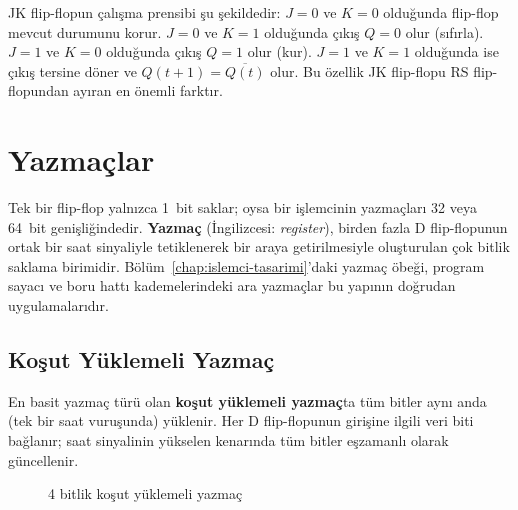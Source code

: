 JK flip-flopun çalışma prensibi şu şekildedir: $J = 0$ ve $K = 0$ olduğunda flip-flop mevcut durumunu korur. $J = 0$ ve $K = 1$ olduğunda çıkış $Q = 0$ olur (sıfırla). $J = 1$ ve $K = 0$ olduğunda çıkış $Q = 1$ olur (kur). $J = 1$ ve $K = 1$ olduğunda ise çıkış tersine döner ve $Q(t+1) = \overline{Q(t)}$ olur. Bu özellik JK flip-flopu RS flip-flopundan ayıran en önemli farktır.


\section{Yazmaçlar}
\label{sec:ekB-yazmaclar}

Tek bir flip-flop yalnızca 1~bit saklar; oysa bir işlemcinin yazmaçları 32 veya 64~bit genişliğindedir. \textbf{Yazmaç} (İngilizcesi: \textit{register}), birden fazla D flip-flopunun ortak bir saat sinyaliyle tetiklenerek bir araya getirilmesiyle oluşturulan çok bitlik saklama birimidir. Bölüm~\ref{chap:islemci-tasarimi}'daki yazmaç öbeği, program sayacı ve boru hattı kademelerindeki ara yazmaçlar bu yapının doğrudan uygulamalarıdır.

\subsection{Koşut Yüklemeli Yazmaç}

En basit yazmaç türü olan \textbf{koşut yüklemeli yazmaç}ta tüm bitler aynı anda (tek bir saat vuruşunda) yüklenir. Her D flip-flopunun girişine ilgili veri biti bağlanır; saat sinyalinin yükselen kenarında tüm bitler eşzamanlı olarak güncellenir.

\begin{figure}[H]
\centering
{}
\caption{4 bitlik koşut yüklemeli yazmaç}
\label{fig:kosut-yazmac}
\end{figure}

